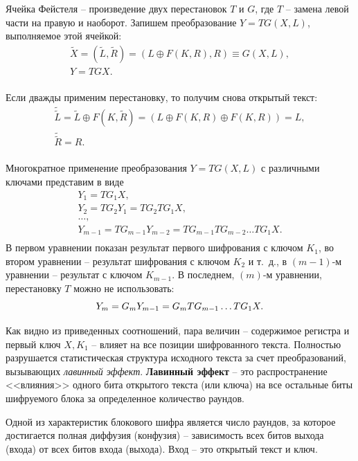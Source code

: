 Ячейка Фейстеля -- произведение двух перестановок $T$ и $G$, где $T$ -- замена левой части на правую и наоборот. Запишем преобразование $Y=TG(X,L)$, выполняемое этой ячейкой:
\[
  \begin{array}{l}
    \tilde{X} = (\tilde{L}, \tilde{R}) = (L \oplus F(K,R), R) \equiv G(X, L), \\
    Y = TGX. \\
  \end{array}
\]

Если дважды применим перестановку, то получим снова открытый текст:
\[
    \begin{array}{l}
        \tilde{\tilde{L}} = \tilde{L} \oplus F(K, \tilde{R}) = (L \oplus F(K,R) \oplus F(K,R)) = L, \\
        \tilde{\tilde{R}} = R.\\
    \end{array}
\]

Многократное применение преобразования $Y=TG(X,L)$ с различными ключами представим в виде
\[
  \begin{array}{l}
    Y_1 = T G_1 X,\\
    Y_2 = T G_2 Y_1 = T G_2 T G_1 X, \\
    \ldots, \\
    Y_{m-1} = T G_{m-1} Y_{m-2} = T G_{m-1} T G_{m-2} \ldots T G_1 X.\\
  \end{array}
\]
В первом уравнении показан результат первого шифрования с ключом $K_{1}$, во втором уравнении -- результат шифрования с ключом $K_{2}$ и т.~д., в $(m-1)$-м уравнении -- результат с ключом $K_{m-1}$. В последнем, $(m)$-м уравнении, перестановку $T$ можно не использовать:
\[
   Y_{m}= G_{m} Y_{m-1} = G_{m} T G_{m-1} \ldots T G_{1} X.\\
\]

Как видно из приведенных соотношений, пара величин -- содержимое регистра и первый ключ $X, K_{1}$ -- влияет на все позиции шифрованного текста. Полностью разрушается статистическая структура исходного текста за счет преобразований, вызывающих \emph{лавинный эффект}. \textbf{Лавинный эффект} -- это распространение <<влияния>> одного бита открытого текста (или ключа) на все остальные биты шифруемого блока за определенное количество раундов.

Одной из характеристик блокового шифра является число раундов, за которое достигается полная диффузия (конфузия) -- зависимость всех битов выхода (входа) от всех битов входа (выхода). Вход -- это открытый текст и ключ.


